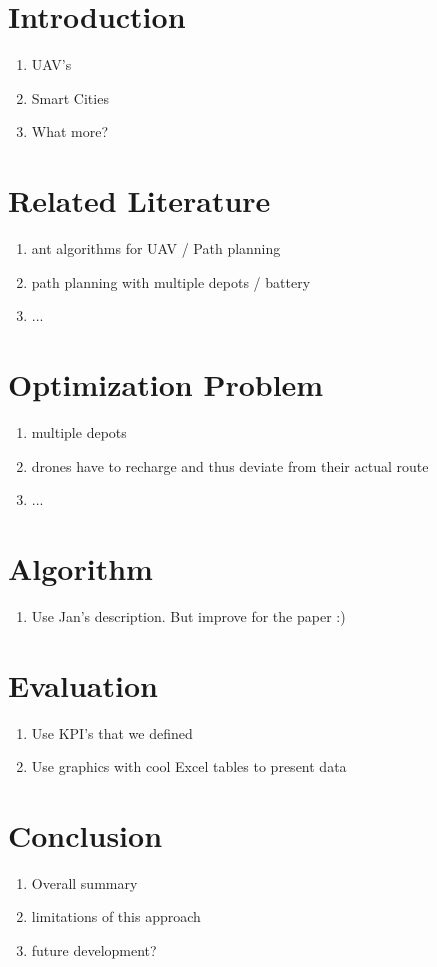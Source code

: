 \section{Introduction}
\begin{enumerate}
	\item UAV's
	\item Smart Cities
	\item What more?
\end{enumerate}

\section{Related Literature}
\begin{enumerate}
	\item ant algorithms for UAV / Path planning
	\item path planning with multiple depots / battery
	\item ...
\end{enumerate}

\section{Optimization Problem}
\begin{enumerate}
	\item multiple depots
	\item drones have to recharge and thus deviate from their actual route
	\item ...
	
\end{enumerate}

\section{Algorithm}

\begin{enumerate}
	\item Use Jan's description. But improve for the paper :)
\end{enumerate}

\section{Evaluation}
\begin{enumerate}
	\item Use KPI's that we defined
	\item Use graphics with cool Excel tables to present data
\end{enumerate}

\section{Conclusion}
\begin{enumerate}
	\item Overall summary
	\item limitations of this approach
	\item future development?
\end{enumerate}

\cite{Winery}